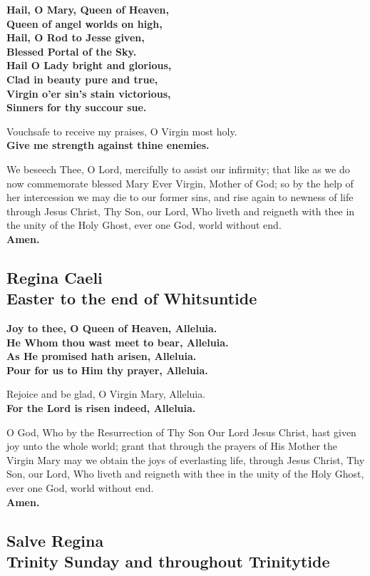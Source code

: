 \textbf{Hail, O Mary, Queen of Heaven,\\
Queen of angel worlds on high,\\
Hail, O Rod to Jesse given,\\
Blessed Portal of the Sky.\\
Hail O Lady bright and glorious,\\
Clad in beauty pure and true,\\
Virgin o'er sin's stain victorious,\\
Sinners for thy succour sue.}

Vouchsafe to receive my praises, O Virgin most holy.\\
\textbf{Give me strength against thine enemies.}

We beseech Thee, O Lord, mercifully to assist our infirmity;
that like as we do now commemorate blessed Mary Ever Virgin, Mother of God;
so by the help of her intercession we may die to our former sins, and rise again to newness of life
through Jesus Christ, Thy Son, our Lord, Who liveth and reigneth with thee in the unity of the Holy Ghost, ever one God, world without end.\\
\textbf{Amen.}

\subsection{Regina Caeli\\
Easter to the end of Whitsuntide}

\textbf{Joy to thee, O Queen of Heaven, Alleluia.\\
He Whom thou wast meet to bear, Alleluia.\\
As He promised hath arisen, Alleluia.\\
Pour for us to Him thy prayer, Alleluia.}

Rejoice and be glad, O Virgin Mary, Alleluia.\\
\textbf{For the Lord is risen indeed, Alleluia.}

O God, Who by the Resurrection of Thy Son Our Lord Jesus Christ, hast given
joy unto the whole world; grant that through the prayers of His Mother the Virgin
Mary may we obtain the joys of everlasting life,
through Jesus Christ, Thy Son, our Lord, Who liveth and reigneth with thee in the unity of the Holy Ghost, ever one God, world without end.\\
\textbf{Amen.}

\subsection{Salve Regina\\
Trinity Sunday and throughout Trinitytide}

